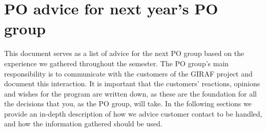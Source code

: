 \section{PO advice for next year's PO group} \label{appendix:PO-advice}

This document serves as a list of advice for the next PO group based on the experience we gathered throughout the semester.
The PO group's main responsibility is to communicate with the customers of the GIRAF project and document this interaction.
It is important that the customers' reactions, opinions and wishes for the program are written down, as these are the foundation for all the decisions that you, as the PO group, will take.
In the following sections we provide an in-depth description of how we advice customer contact to be handled, and how the information gathered should be used.

